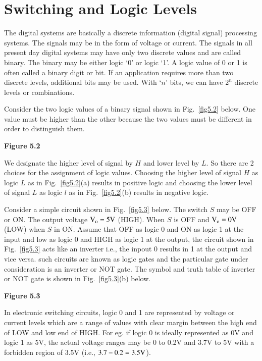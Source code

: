 \section{Switching and Logic Levels}\label{sec5.2}

The digital systems are basically a discrete information (digital signal) processing systems. The signals may be in the form of voltage or current. The signals in all present day digital systems may have only two discrete values and are called binary. The binary may be either logic `0' or logic `1'. A logic value of 0 or 1 is often called a binary digit or bit. If an application requires more than two discrete levels, additional bits may be used. With `$n$' bits, we can have $2^{n}$ discrete levels or combinations.

Consider the two logic values of a binary signal shown in Fig.~\ref{fig5.2} below. One value must be higher than the other because the two values must be different in order to distinguish them.
\begin{center}
{\bf Figure 5.2}
\end{center}

We designate the higher level of signal by $H$ and lower level by $L$. So there are 2 choices for the assignment of logic values. Choosing the higher level of signal $H$ as logic $L$ as in Fig.~\ref{fig5.2}(a) results in positive logic and choosing the lower level of signal $L$ as logic $l$ as in Fig.~\ref{fig5.2}(b) results in negative logic.

Consider a simple circuit shown in Fig.~\ref{fig5.3} below. The switch $S$ may be OFF or ON. The output voltage $\textrm{V}_{\textrm{o}}=5\textrm{V}$ (HIGH). When $S$ is OFF and $\textrm{V}_{\textrm{o}}=0\textrm{V}$ (LOW) when $S$ in ON. Assume that OFF as logic 0 and ON as logic 1 at the input and low as logic 0 and HIGH as logic 1 at the output, the circuit shown in Fig.~\ref{fig5.3} acts like an inverter i.e., the inpout 0 results in 1 at the output and vice versa. such circuits are known as logic gates and the particular gate under consideration is an inverter or NOT gate. The symbol and truth table of inverter or NOT gate is shown in Fig.~\ref{fig5.3}(b) below.
\begin{center}
{\bf Figure 5.3}
\end{center}

\smallskip
{}

In electronic switching circuits, logic 0 and 1 are represented by voltage or current levels which are a range of values with clear margin between the high end of LOW and low end of HIGH. For eg. if logic 0 is ideally represented as 0V and logic 1 as 5V, the actual voltage ranges may be 0 to 0.2V and 3.7V to 5V with a forbidden region of 3.5V (i.e., $3.7-0.2=3.5\textrm{V}$).

